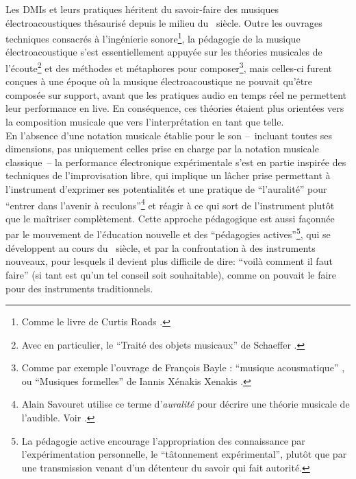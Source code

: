 \noindent Les \glspl{DMI} et leurs pratiques héritent du savoir-faire des musiques électroacoustiques thésaurisé depuis le milieu du ~siècle. Outre les ouvrages techniques consacrés à l'ingénierie sonore\footnote{Comme le livre de Curtis Roads  \cite{roads_foundations_1985}.}, la pédagogie de la musique électroacoustique s'est essentiellement appuyée sur les théories musicales de l'écoute\footnote{Avec en particulier, le ``Traité des objets musicaux'' de Schaeffer \cite{schaeffer_traite_1966}.} et des méthodes et métaphores pour composer\footnote{Comme par exemple l'ouvrage de François Bayle : ``musique acousmatique'' \cite{bayle_musique_1993}, ou ``Musiques formelles'' de Iannis Xénakis Xenakis \cite{xenakis_musiques_1963}.}, mais celles-ci furent conçues à une époque où la musique électroacoustique ne pouvait qu'être composée sur support, avant que les pratiques audio en temps réel ne permettent leur performance en live. En conséquence, ces théories étaient plus orientées vers la composition musicale que vers l'interprétation en tant que telle.\\
\indent En l'absence d'une notation musicale établie pour le son --~incluant toutes ses dimensions, pas uniquement celles prise en charge par la notation musicale classique~-- la performance électronique expérimentale s'est en partie inspirée des techniques de l'improvisation libre, qui implique un lâcher prise permettant à l'instrument d'exprimer ses potentialités et une pratique de ``l'auralité'' pour ``entrer dans l'avenir à reculons''\footnote{Alain Savouret utilise ce terme d'\textit{auralité} pour décrire une théorie musicale de l'audible. Voir \cite{savouret_introduction_2010}.} et réagir à ce qui sort de l'instrument plutôt que le maîtriser complètement. Cette approche pédagogique est aussi façonnée par le mouvement de l'éducation nouvelle et des ``pédagogies actives''\footnote{La pédagogie active encourage l'appropriation des connaissance par l'expérimentation personnelle, le ``tâtonnement expérimental''\cite{freinet_les_1964}, plutôt que par une transmission venant d'un détenteur du savoir qui fait autorité.}, qui se développent au cours du ~siècle, et par la confrontation à des instruments nouveaux, pour lesquels il devient plus difficile de dire: ``voilà comment il faut faire'' (si tant est qu'un tel conseil soit souhaitable), comme on pouvait le faire pour des instruments traditionnels.

